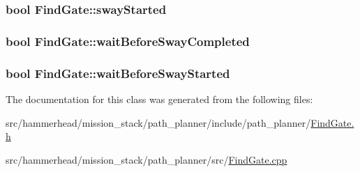 \subsubsection[{\texorpdfstring{sway\+Started}{swayStarted}}]{\setlength{\rightskip}{0pt plus 5cm}bool Find\+Gate\+::sway\+Started}\hypertarget{classFindGate_a6b7960689fa102c97a9c18425871de04}{}\label{classFindGate_a6b7960689fa102c97a9c18425871de04}
\subsubsection[{\texorpdfstring{wait\+Before\+Sway\+Completed}{waitBeforeSwayCompleted}}]{\setlength{\rightskip}{0pt plus 5cm}bool Find\+Gate\+::wait\+Before\+Sway\+Completed}\hypertarget{classFindGate_aff3c61e521e111ac987278ef7383cb5f}{}\label{classFindGate_aff3c61e521e111ac987278ef7383cb5f}
\subsubsection[{\texorpdfstring{wait\+Before\+Sway\+Started}{waitBeforeSwayStarted}}]{\setlength{\rightskip}{0pt plus 5cm}bool Find\+Gate\+::wait\+Before\+Sway\+Started}\hypertarget{classFindGate_ab9f4c3d8f8d3a862561f48e41808a5c6}{}\label{classFindGate_ab9f4c3d8f8d3a862561f48e41808a5c6}


The documentation for this class was generated from the following files\+:\begin{DoxyCompactItemize}
\item 
src/hammerhead/mission\+\_\+stack/path\+\_\+planner/include/path\+\_\+planner/\hyperlink{FindGate_8h}{Find\+Gate.\+h}\item 
src/hammerhead/mission\+\_\+stack/path\+\_\+planner/src/\hyperlink{FindGate_8cpp}{Find\+Gate.\+cpp}\end{DoxyCompactItemize}

